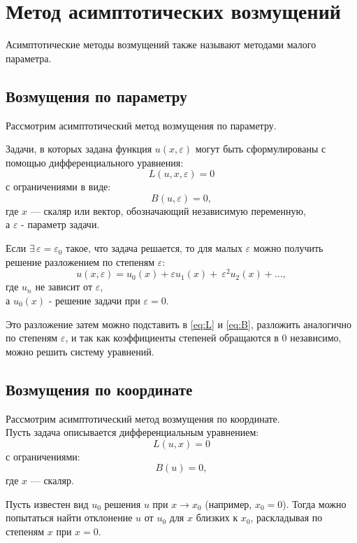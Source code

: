 \chapter*{Метод асимптотических возмущений}

Асимптотические методы возмущений
также называют методами малого параметра.

\section*{Возмущения по параметру}
Рассмотрим асимптотический метод возмущения по параметру.

Задачи, в которых задана функция $u(x, \varepsilon)$
могут быть сформулированы с помощью
дифференциального уравнения:
\begin{equation}
    \label{eq:L}
    L(u, x, \varepsilon) = 0
\end{equation}
с ограничениями в виде:
\begin{equation}
    \label{eq:B}
    B(u, \varepsilon) = 0,
\end{equation}
где $x$ --- скаляр или вектор, обозначающий независимую переменную,\\
а $\varepsilon$ - параметр задачи.

Если $\exists \, \varepsilon = \varepsilon_0$
такое, что задача решается, то для малых $\varepsilon$
можно получить решение разложением по степеням $\varepsilon$:
\begin{equation*}
   u(x, \varepsilon) = u_0(x) + \varepsilon u_1(x) + \
   \varepsilon^2 u_2(x) + \dots,
\end{equation*}
где $u_n$ не зависит от $\varepsilon$,\\
а $u_0(x)$ - решение задачи при $\varepsilon = 0$.

Это разложение затем можно подставить
в \eqref{eq:L} и \eqref{eq:B},
разложить аналогично по степеням $\varepsilon$,
и так как коэффициенты степеней обращаются в 0 независимо,
можно решить систему уравнений.

\clearpage
\section*{Возмущения по координате}

Рассмотрим асимптотический метод возмущения по координате.\\
Пусть задача описывается дифференциальным уравнением:
\begin{equation*}
    L(u, x) = 0
\end{equation*}
с ограничениями:
\begin{equation*}
    B(u) = 0,
\end{equation*}
где $x$ --- скаляр.

Пусть известен вид $u_0$ решения $u$
при $x \to x_0$ (например, $x_0 = 0$).
Тогда можно попытаться найти отклонение $u$ от $u_0$
для $x$ близких к $x_0$,
раскладывая по степеням $x$ при $x = 0$.

